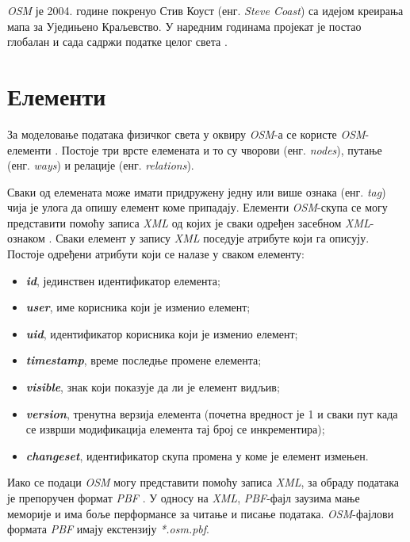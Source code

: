 \documentclass[12pt,oneside]{memoir}
\begin{document}
\textit{OSM} је 2004. године покренуо Стив Коуст (енг. \textit{Steve Coast}) са идејом креирања мапа за Уједињено Краљевство. У наредним годинама пројекат је постао глобалан и сада садржи податке целог света \cite{osm_wiki}.

\section{Елементи}
\label{sec:osm_elementi}

За моделовање података физичког света у оквиру \textit{OSM}-а се користе \textit{OSM}-елементи \cite{osm_wiki}. Постоје три врсте елемената и то су чворови (енг. \textit{nodes}), путање (енг. \textit{ways}) и релације (енг. \textit{relations}).

Сваки од елемената може имати придружену једну или више ознака (енг. \textit{tag}) чија је улога да опишу елемент коме припадају. Елементи \textit{OSM}-скупа се могу представити помоћу записа \textit{XML}  од којих је сваки одређен засебном \textit{XML}-ознаком \cite{osm_xml}. Сваки елемент у запису \textit{XML} поседује атрибуте који га описују. Постоје одређени атрибути који се налазе у сваком елементу:

\begin{itemize}
	\item \textbf{\textit{id}}, јединствен идентификатор елемента;
	\item \textbf{\textit{user}}, име корисника који је изменио елемент;
	\item \textbf{\textit{uid}}, идентификатор корисника који је изменио елемент;
	\item \textbf{\textit{timestamp}}, време последње промене елемента;
	\item \textbf{\textit{visible}}, знак који показује да ли је елемент видљив;
	\item \textbf{\textit{version}}, тренутна верзија елемента (почетна вредност је 1 и сваки пут када се изврши модификација елемента тај број се инкрементира);
	\item \textbf{\textit{changeset}}, идентификатор скупа промена у коме је елемент измењен.
\end{itemize}

Иако се подаци \textit{OSM} могу представити помоћу записа \textit{XML}, за обраду података је препоручен формат \textit{PBF} \cite{osm_pbf_format}. У односу на \textit{XML}, \textit{PBF}-фајл заузима мање меморије и има боље перформансе за читање и писање података. \textit{OSM}-фајлови формата \textit{PBF} имају екстензију \textit{*.osm.pbf}. 
\end{document}
